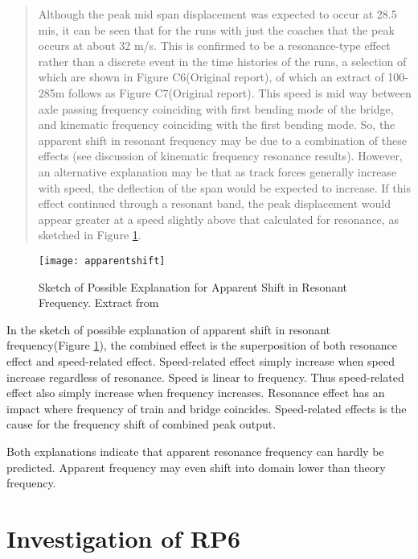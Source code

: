 \begin{quote}
Although the peak mid span displacement was expected to occur at 28.5 mis, it can be seen that for the runs with just the coaches that the peak occurs at about 32 m/s. This is confirmed to be a resonance-type effect rather than a discrete event in the time histories of the runs, a selection of which are shown in Figure C6(Original report), of which an extract of 100-285m follows as Figure C7(Original report). This speed is mid way between axle passing frequency coinciding with first bending mode of the bridge, and kinematic frequency coinciding with the first bending mode. So, the apparent shift in resonant frequency may be due to a combination of these effects (see discussion of kinematic frequency resonance results). However, an alternative explanation may be that as track forces generally increase with speed, the deflection of the span would be expected to increase. If this effect continued through a resonant band, the peak displacement would appear greater at a speed slightly above that calculated for resonance, as sketched in Figure \ref{fig:apparentshift}.
\end{quote}

\begin{figure}[h]
    \centering
    \texttt{[image: apparentshift]}
    \caption{Sketch of Possible Explanation for Apparent Shift in Resonant Frequency. Extract from \citet[Appendix 2]{d181dt329}}
    \label{fig:apparentshift}
\end{figure}

In the sketch of possible explanation of apparent shift in resonant frequency(Figure \ref{fig:apparentshift}), the combined effect is the superposition of both resonance effect and speed-related effect. Speed-related effect simply increase when speed increase regardless of resonance. Speed is linear to frequency. Thus speed-related effect also simply increase when frequency increases. Resonance effect has an impact where frequency of train and bridge coincides. Speed-related effects is the cause for the frequency shift of combined peak output.

Both explanations indicate that apparent resonance frequency can hardly be predicted. Apparent frequency may even shift into domain lower than theory frequency. 


\section{Investigation of RP6}


